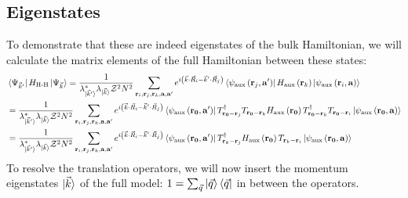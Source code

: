 \documentclass[reprint,hidelinks,onecolumn]{revtex4-2}
\begin{document}
\subsection{Eigenstates}
To demonstrate that these are indeed eigenstates of the bulk Hamiltonian, we will calculate the matrix elements of the full Hamiltonian between these states:
\begin{equation}\begin{aligned}
	&\bra{\Psi_{\vec k^\prime}}H_\text{H-H} \ket{\Psi_{\vec k}} = \frac{1}{\lambda^*_{\ket{\vec k^\prime}} \lambda_{\ket{\vec k}} \mathcal{Z}^2 N^2}\sum_{{\bf r}_i, {\bf r}_j, {\bf r}_k, {\bf a}, {\bf a}^\prime}e^{i\left(\vec{k}\cdot\vec{R}_i - \vec{k}^\prime\cdot\vec{R}_j\right)} \bra{\psi_\text{aux}\left({\bf r}_j, {\bf a}^\prime\right)} H_\text{aux}\left({\bf r}_k\right) \ket{\psi_\text{aux}\left({\bf r}_i, {\bf a}\right)}\\
	&= \frac{1}{\lambda^*_{\ket{\vec k^\prime}} \lambda_{\ket{\vec k}} \mathcal{Z}^2 N^2}\sum_{{\bf r}_i, {\bf r}_j, {\bf r}_k, {\bf a}, {\bf a}^\prime}e^{i\left(\vec{k}\cdot\vec{R}_i - \vec{k}^\prime\cdot\vec{R}_j\right)} \bra{\psi_\text{aux}\left({\bf r_0}, {\bf a}^\prime\right)} T^\dagger_{{\bf r_0} - {\bf r}_j} T_{{\bf r_0} - {\bf r}_k} H_\text{aux}\left({\bf r_0}\right) T^\dagger_{{\bf r_0} - {\bf r}_k} T_{{\bf r_0} - {\bf r}_i} \ket{\psi_\text{aux}\left({\bf r_0}, {\bf a}\right)}\\
	&= \frac{1}{\lambda^*_{\ket{\vec k^\prime}} \lambda_{\ket{\vec k}} \mathcal{Z}^2 N^2}\sum_{{\bf r}_i, {\bf r}_j, {\bf r}_k, {\bf a}, {\bf a}^\prime}e^{i\left(\vec{k}\cdot\vec{R}_i - \vec{k}^\prime\cdot\vec{R}_j\right)} \bra{\psi_\text{aux}\left({\bf r_0}, {\bf a}^\prime\right)} T^\dagger_{{\bf r}_k - {\bf r}_j} H_\text{aux}\left({\bf r_0}\right) T_{{\bf r}_k - {\bf r}_i} \ket{\psi_\text{aux}\left({\bf r_0}, {\bf a}\right)}
\end{aligned}\end{equation}
To resolve the translation operators, we will now insert the momentum eigenstates \(\ket{\vec k}\) of the full model: \(1 = \sum_{\vec q}\ket{\vec q}\bra{\vec q}\) in between the operators.
\end{document}
